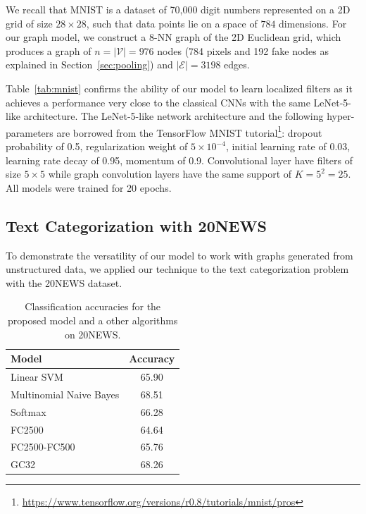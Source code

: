 \documentclass{article}
\newcommand{\V}{\mathcal{V}}
\newcommand{\E}{\mathcal{E}}
\newcommand{\tabref}[1]{Table~\ref{tab:#1}}
\newcommand{\secref}[1]{Section~\ref{sec:#1}}
\newcommand{\todo}[1]{{\color{red} #1 }}
\begin{document}
We recall that MNIST is a dataset of 70,000 digit numbers represented on a 2D grid of size $28
\times 28$, such that data points lie on a space of $784$ dimensions. For
our graph model, we construct a $8$-NN graph of the 2D Euclidean
grid, which produces a graph of $n = |\V| = 976$ nodes (784 pixels and 192 fake
nodes as explained in \secref{pooling}) and $|\E| = 3198$ edges.

\tabref{mnist} confirms the ability of our model to learn localized filters
as it achieves a performance very close to the classical CNNs with the same LeNet-5-like
architecture. The LeNet-5-like network architecture and the following hyper-parameters are
borrowed from the TensorFlow MNIST tutorial\footnote{
\url{https://www.tensorflow.org/versions/r0.8/tutorials/mnist/pros}}: dropout
probability of 0.5, regularization weight of $5\times10^{-4}$, initial learning
rate of 0.03, learning rate decay of 0.95, momentum of 0.9. Convolutional layer
have filters of size $5 \times 5$ while graph convolution layers have the same
support of $K = 5^2 = 25$. All models were trained for 20 epochs.







\subsection{Text Categorization with 20NEWS}
To demonstrate the versatility of our model to work with graphs generated from unstructured data, we applied our technique to the text categorization problem with the 20NEWS dataset.


\begin{table}[h!] \centering
\begin{tabular}{lc} \toprule
Model & Accuracy \\
\midrule
Linear SVM & 65.90 \\
Multinomial Naive Bayes & 68.51 \\
Softmax & 66.28 \\
\addlinespace
FC2500 & 64.64 \\
FC2500-FC500 & 65.76 \\
\addlinespace
GC32 & 68.26 \\
\bottomrule \end{tabular}
\caption{Classification accuracies for the proposed model and a other algorithms
on 20NEWS.} 
\label{tab:20news}
\end{table}
\end{document}

